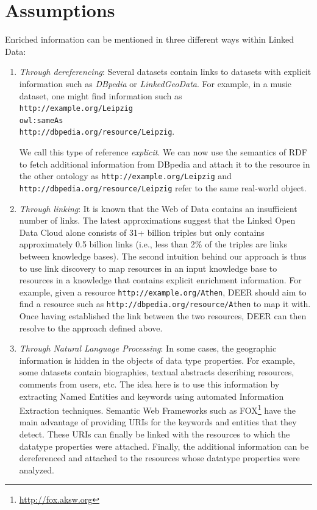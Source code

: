 \documentclass[a4paper,twoside,bibtotoc,abstracton,12pt,BCOR=15mm]{article}
\newcommand{\geolift}{\textsc{DEER}\xspace}
\begin{document}
\section{Assumptions}
 Enriched information can be mentioned in three different ways within Linked Data:
\begin{enumerate}
\item \emph{Through dereferencing}: Several datasets contain links to datasets with explicit information such as \emph{DBpedia} or \emph{LinkedGeoData}. 
For example, in a music dataset, one might find information such as\\ 
\texttt{http://example.org/Leipzig \\
owl:sameAs \\ 
http://dbpedia.org/resource/Leipzig}.

We call this type of reference \emph{explicit}. 
We can now use the semantics of RDF to fetch additional information from DBpedia and attach it to the resource in the other ontology as \texttt{http://example.org/Leipzig} and \texttt{http://dbpedia.org/resource/Leipzig} refer to the same real-world object.

\item \emph{Through linking}: It is known that the Web of Data contains an insufficient number of links. 
The latest approximations suggest that the Linked Open Data Cloud alone consists of 31+ billion triples but only contains approximately 0.5 billion links (i.e., less than 2\% of the triples are links between knowledge bases). 
The second intuition behind our approach is thus to use link discovery to map resources in an input knowledge base to resources in a knowledge that contains explicit enrichment information. 
For example, given a resource \texttt{http://example.org/Athen}, \geolift should aim to find a resource such as \texttt{http://dbpedia.org/resource/Athen} to map it with. 
Once having established the link between the two resources, \geolift can then resolve to the approach defined above.

\item \emph{Through Natural Language Processing}: In some cases, the geographic information is hidden in the objects of data type properties. 
For example, some datasets contain biographies, textual abstracts describing resources, comments from users, etc.
The idea here is to use this information by extracting Named Entities and keywords using automated Information Extraction techniques.
Semantic Web Frameworks such as FOX\footnote{\url{http://fox.aksw.org}} have the main advantage of providing URIs for the keywords and entities that they detect.
These URIs can finally be linked with the resources to which the datatype properties were attached.
Finally, the additional information can be dereferenced and attached to the resources whose datatype properties were analyzed.
\end{enumerate}
\end{document}
